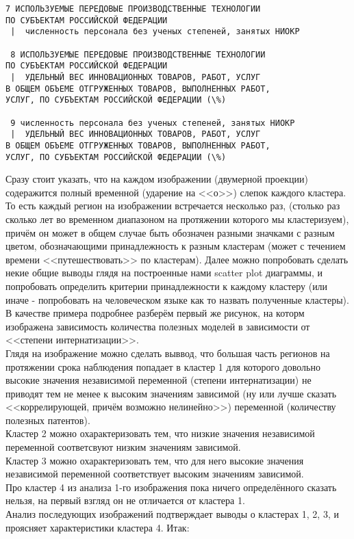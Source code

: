 \documentclass[11pt]{article}
\begin{document}
\begin{Verbatim}[commandchars=\\\{\}]
 7 ИСПОЛЬЗУЕМЫЕ ПЕРЕДОВЫЕ ПРОИЗВОДСТВЕННЫЕ ТЕХНОЛОГИИ
ПО СУБЪЕКТАМ РОССИЙСКОЙ ФЕДЕРАЦИИ 
 |  численность персонала без ученых степеней, занятых НИОКР

 8 ИСПОЛЬЗУЕМЫЕ ПЕРЕДОВЫЕ ПРОИЗВОДСТВЕННЫЕ ТЕХНОЛОГИИ
ПО СУБЪЕКТАМ РОССИЙСКОЙ ФЕДЕРАЦИИ 
 |  УДЕЛЬНЫЙ ВЕС ИННОВАЦИОННЫХ ТОВАРОВ, РАБОТ, УСЛУГ
В ОБЩЕМ ОБЪЕМЕ ОТГРУЖЕННЫХ ТОВАРОВ, ВЫПОЛНЕННЫХ РАБОТ,
УСЛУГ, ПО СУБЪЕКТАМ РОССИЙСКОЙ ФЕДЕРАЦИИ (\%)

 9 численность персонала без ученых степеней, занятых НИОКР 
 |  УДЕЛЬНЫЙ ВЕС ИННОВАЦИОННЫХ ТОВАРОВ, РАБОТ, УСЛУГ
В ОБЩЕМ ОБЪЕМЕ ОТГРУЖЕННЫХ ТОВАРОВ, ВЫПОЛНЕННЫХ РАБОТ,
УСЛУГ, ПО СУБЪЕКТАМ РОССИЙСКОЙ ФЕДЕРАЦИИ (\%)

    \end{Verbatim}

    Сразу стоит указать, что на каждом изображении (двумерной проекции)
содеражится полный временной (ударение на <<о>>) слепок каждого
кластера. То есть каждый регион на изображении встречается несколько
раз, (столько раз сколько лет во временном диапазоном на протяжении
которого мы кластеризуем), причём он может в общем случае быть обозначен
разными значками с разным цветом, обозначающими принадлежность к разным
кластерам (может с течением времени <<путешествовать>> по
кластерам). Далее можно попробовать сделать некие общие выводы глядя на
построенные нами scatter plot диаграммы, и попробовать определить
критерии принадлежности к каждому кластеру (или иначе - попробовать на
человеческом языке как то назвать полученные кластеры). В качестве
примера подробнее разберём первый же рисунок, на которм изображена
зависимость количества полезных моделей в зависимости от
<<степени интернатизации>>. \\ Глядя на изображение
можно сделать выввод, что большая часть регионов на протяжении срока
наблюдения попадает в кластер 1 для которого довольно высокие значения
независимой переменной (степени интернатизации) не приводят тем не менее
к высоким значениям зависимой (ну или лучше сказать
<<коррелирующей, причём возможно нелинейно>>) переменной
(количеству полезных патентов). \\ Кластер 2 можно
охарактеризовать тем, что низкие значения независимой переменной
соответсвуют низким значениям зависимой. \\ Кластер 3 можно
охарактеризовать тем, что для него высокие значения независимой
переменной соответствует высоким значениям зависимой.
\\ Про кластер 4 из анализа 1-го изображения пока ничего
определённого сказать нельзя, на первый взгляд он не отличается от
кластера 1. \\ Анализ последующих изображений подтверждает
выводы о кластерах 1, 2, 3, и проясняет характеристики кластера 4. Итак:
\end{document}
